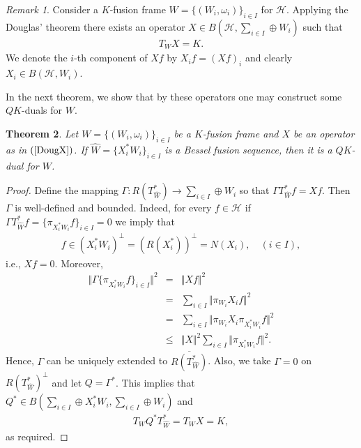 \documentclass{birkjour}
\newtheorem{thm}{Theorem}[section]
\theoremstyle{definition}
\theoremstyle{remark}
\newtheorem{rem}[thm]{Remark}
\numberwithin{equation}{section}
\begin{document}
\begin{rem}
Consider a $K$-fusion frame $W = \lbrace (W_{i}, \omega_{i})\rbrace_{i\in I}$ for $\mathcal{H}$.    Applying the Douglas' theorem \cite{Douglas} there exists an operator $X\in B(\mathcal{H}, \sum_{i\in I}\oplus W_{i})$ such that
\begin{eqnarray}\label{DougX}
 T_{W}X=K.
\end{eqnarray}
 We denote the $i$-th component of $Xf$ by $X_{i}f=(Xf)_{i}$ and clearly $X_{i}\in B(\mathcal{H}, W_{i})$. 
\end{rem}
 In the next theorem, we show that by these operators  one may construct some $QK$-duals for $W$.
\begin{thm}\label{3.188}
Let $W = \lbrace (W_{i}, \omega_{i})\rbrace_{i\in I}$ be a $K$-fusion frame and $X$ be an operator  as in $(\ref{DougX})$. If $\widehat{W}=\{X_{i}^{*}W_{i}\}_{i\in I}$ is a Bessel fusion sequence, then it is a $QK$-dual for $W$.
\end{thm}
\begin{proof}
Define the mapping $\Gamma:R(T_{\widehat{W}}^{*})\rightarrow \sum_{i\in I}\oplus W_{i}$ so that $\Gamma T_{\widehat{W}}^{*}f = Xf$. Then $\Gamma$ is well-defined and bounded. Indeed, for every $f\in \mathcal{H}$ if $\Gamma T_{\widehat{W}}^{*}f = \{\pi_{X_{i}^{*}W_{i}}f\}_{i\in I}=0$ we imply that
\begin{eqnarray*}
f\in (X_{i}^{*}W_{i})^{\perp} = (R(X_{i}^{*}))^{\perp} = N(X_{i}), \quad (i\in I),
\end{eqnarray*}
i.e., $Xf=0$. Moreover, 
\begin{eqnarray*}
\Vert \Gamma \{\pi_{X_{i}^{*}W_{i}}f\}_{i\in I}\Vert^{2}&=& \Vert Xf\Vert^{2}\\
&=& \sum_{i\in I}\Vert \pi_{W_{i}}X_{i}f\Vert^{2}\\
&=&\sum_{i\in I}\Vert \pi_{W_{i}}X_{i}\pi_{X_{i}^{*}W_{i}}f\Vert^{2}\\
&\leq&\Vert X\Vert^{2} \sum_{i\in I}\Vert \pi_{X_{i}^{*}W_{i}}f\Vert^{2}.
\end{eqnarray*}
Hence, $\Gamma$ can be uniquely extended to $\overline{R(T_{\widehat{W}}^{*})}$. Also, we take $\Gamma=0$ on $R(T_{\widehat{W}}^{*})^{\perp}$ and let $Q=\Gamma^{*}$. This implies that $Q^{*}\in B(\sum_{i\in I}\oplus X_{i}^{*}W_{i}, \sum_{i\in I}\oplus W_{i})$ and 
\begin{eqnarray*}
T_{W}Q^{*}T_{\widehat{W}}^{*}= T_{W}X  = K,
\end{eqnarray*}
as required.
\end{proof}
\end{document}
